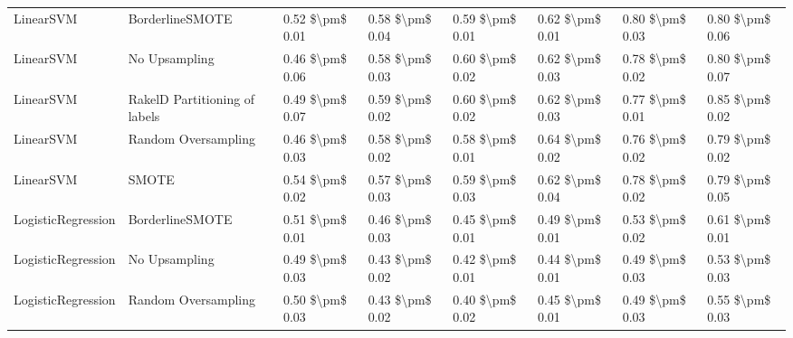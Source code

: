 \begin{tabular}{llllllll}
                      LinearSVM &               BorderlineSMOTE &     0.52 \$\textbackslash pm\$ 0.01 &           0.58 \$\textbackslash pm\$ 0.04 &       0.59 \$\textbackslash pm\$ 0.01 &        0.62 \$\textbackslash pm\$ 0.01 &                         0.80 \$\textbackslash pm\$ 0.03 & 0.80 \$\textbackslash pm\$ 0.06 \\
                      LinearSVM &                 No Upsampling &     0.46 \$\textbackslash pm\$ 0.06 &           0.58 \$\textbackslash pm\$ 0.03 &       0.60 \$\textbackslash pm\$ 0.02 &        0.62 \$\textbackslash pm\$ 0.03 &                         0.78 \$\textbackslash pm\$ 0.02 & 0.80 \$\textbackslash pm\$ 0.07 \\
                      LinearSVM & RakelD Partitioning of labels &     0.49 \$\textbackslash pm\$ 0.07 &           0.59 \$\textbackslash pm\$ 0.02 &       0.60 \$\textbackslash pm\$ 0.02 &        0.62 \$\textbackslash pm\$ 0.03 &                         0.77 \$\textbackslash pm\$ 0.01 & 0.85 \$\textbackslash pm\$ 0.02 \\
                      LinearSVM &           Random Oversampling &     0.46 \$\textbackslash pm\$ 0.03 &           0.58 \$\textbackslash pm\$ 0.02 &       0.58 \$\textbackslash pm\$ 0.01 &        0.64 \$\textbackslash pm\$ 0.02 &                         0.76 \$\textbackslash pm\$ 0.02 & 0.79 \$\textbackslash pm\$ 0.02 \\
                      LinearSVM &                         SMOTE &     0.54 \$\textbackslash pm\$ 0.02 &           0.57 \$\textbackslash pm\$ 0.03 &       0.59 \$\textbackslash pm\$ 0.03 &        0.62 \$\textbackslash pm\$ 0.04 &                         0.78 \$\textbackslash pm\$ 0.02 & 0.79 \$\textbackslash pm\$ 0.05 \\
             LogisticRegression &               BorderlineSMOTE &     0.51 \$\textbackslash pm\$ 0.01 &           0.46 \$\textbackslash pm\$ 0.03 &       0.45 \$\textbackslash pm\$ 0.01 &        0.49 \$\textbackslash pm\$ 0.01 &                         0.53 \$\textbackslash pm\$ 0.02 & 0.61 \$\textbackslash pm\$ 0.01 \\
             LogisticRegression &                 No Upsampling &     0.49 \$\textbackslash pm\$ 0.03 &           0.43 \$\textbackslash pm\$ 0.02 &       0.42 \$\textbackslash pm\$ 0.01 &        0.44 \$\textbackslash pm\$ 0.01 &                         0.49 \$\textbackslash pm\$ 0.03 & 0.53 \$\textbackslash pm\$ 0.03 \\
             LogisticRegression &           Random Oversampling &     0.50 \$\textbackslash pm\$ 0.03 &           0.43 \$\textbackslash pm\$ 0.02 &       0.40 \$\textbackslash pm\$ 0.02 &        0.45 \$\textbackslash pm\$ 0.01 &                         0.49 \$\textbackslash pm\$ 0.03 & 0.55 \$\textbackslash pm\$ 0.03 \\

\end{tabular}
